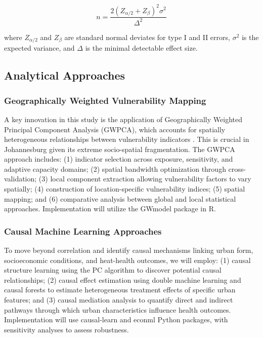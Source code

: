 \begin{equation}
n = \frac{2(Z_{\alpha/2} + Z_{\beta})^2\sigma^2}{\Delta^2}
\end{equation}

where $Z_{\alpha/2}$ and $Z_{\beta}$ are standard normal deviates for type I and II errors, $\sigma^2$ is the expected variance, and $\Delta$ is the minimal detectable effect size.

\subsection{Analytical Approaches}

\subsubsection{Geographically Weighted Vulnerability Mapping}\label{gwpca}
A key innovation in this study is the application of Geographically Weighted Principal Component Analysis (GWPCA), which accounts for spatially heterogeneous relationships between vulnerability indicators \citep{Quispe2023, Praharaj2024}. This is crucial in Johannesburg given its extreme socio-spatial fragmentation. The GWPCA approach includes: (1) indicator selection across exposure, sensitivity, and adaptive capacity domains; (2) spatial bandwidth optimization through cross-validation; (3) local component extraction allowing vulnerability factors to vary spatially; (4) construction of location-specific vulnerability indices; (5) spatial mapping; and (6) comparative analysis between global and local statistical approaches. Implementation will utilize the GWmodel package in R.

\subsubsection{Causal Machine Learning Approaches}
To move beyond correlation and identify causal mechanisms linking urban form, socioeconomic conditions, and heat-health outcomes, we will employ: (1) causal structure learning using the PC algorithm to discover potential causal relationships; (2) causal effect estimation using double machine learning and causal forests to estimate heterogeneous treatment effects of specific urban features; and (3) causal mediation analysis to quantify direct and indirect pathways through which urban characteristics influence health outcomes. Implementation will use causal-learn and econml Python packages, with sensitivity analyses to assess robustness.

